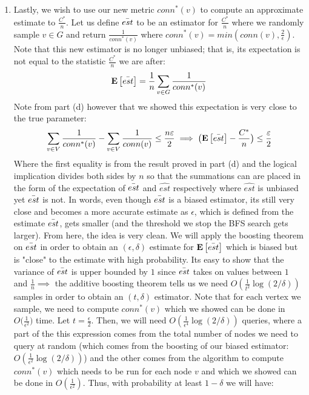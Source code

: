 \documentclass[12pt]{article}
\begin{document}
\begin{solution}
\begin{enumerate}[label=(\alph*)]
    \[
     \big|\sum_{v\in V}{\frac{1}{conn^*(v)}} - \sum_{v\in V}{\frac{1}{conn(v)}}\big| = \sum_{v\in V}\big ({\frac{1}{conn^*(v)}} - \frac{1}{conn(v)}\big) = \sum_{x\in K}{\frac{\epsilon}{2}} - \frac{1}{conn(x)} \leq \sum_{x\in K}{\frac{\epsilon}{2}} = \frac{k\epsilon}{2} \leq \frac{n\epsilon}{2}
    \]
    where the last inequality follows from the fact that $k$ could be as large as n. \qed
    \item Lastly, we wish to use our new metric $conn^*(v)$ to compute an approximate estimate to $\frac{C^*}{n}$. Let us define $\Bar{est}$ to be an estimator for $\frac{C^*}{n}$ where we randomly sample $v \in G$ and return $\frac{1}{conn^*(v)}$ where $conn^*(v) = min(conn(v), \frac{2}{\epsilon})$. Note that this new estimator is no longer unbiased; that is, its expectation is not equal to the statistic $\frac{C^*}{n}$ we are after:
    \[
    \mathbf{E}\left[\Bar{est}\right] = \frac{1}{n}\sum_{v\in G}{\frac{1}{conn^*(v)}}
    \]
    Note from part (d) however that we showed this expectation is very close to the true parameter:
    \[
    \sum_{v\in V}{\frac{1}{conn^*(v)}} - \sum_{v\in V}{\frac{1}{conn(v)}} \leq \frac{n\varepsilon}{2} \implies \big(\mathbf{E}\left[\Bar{est}\right] - \frac{C^*}{n}\big) \leq \frac{\varepsilon}{2}
    \]
    Where the first equality is from the result proved in part (d) and the logical implication divides both sides by $n$ so that the summations can are placed in the form of the expectation of $\Bar{est}$ and $\hat{est}$ respectively where $\hat{est}$ is unbiased yet $\Bar{est}$ is not. In words, even though $\Bar{est}$ is a biased estimator, its still very close and becomes a more accurate estimate as $\epsilon$, which is defined from the estimate $\Bar{est}$, gets smaller (and the threshold we stop the BFS search gets larger). From here, the idea is very clean. We will apply the boosting theorem on $\Bar{est}$ in order to obtain an $(\epsilon,\delta)$ estimate for $\mathbf{E}\left[\Bar{est}\right]$ which is biased but is "close" to the estimate with high probability. Its easy to show that the variance of $\Bar{est}$ is upper bounded by $1$ since $\Bar{est}$ takes on values between $1$ and $\frac{1}{n} \implies$ the additive boosting theorem tells us we need $O(\frac{1}{t^2}\log(2/\delta))$ samples in order to obtain an $(t,\delta)$ estimator. Note that for each vertex we sample, we need to compute $conn^*(v)$ which we showed can be done in $O\big(\frac{1}{\epsilon^2}\big)$ time. Let $t = \frac{\epsilon}{2}$. Then, we will need $O(\frac{1}{\epsilon^4}\log(2/\delta))$ queries, where a part of the this expression comes from the total number of nodes we need to query at random (which comes from the boosting of our biased estimator: $O(\frac{1}{\epsilon^2}\log(2/\delta))$) and the other comes from the algorithm to compute $conn^*(v)$ which needs to be run for each node $v$ and which we showed can be done in $O(\frac{1}{\epsilon^2})$. Thus, with probability at least $1-\delta$ we will have:

\end{enumerate}
\end{solution}
\end{document}
